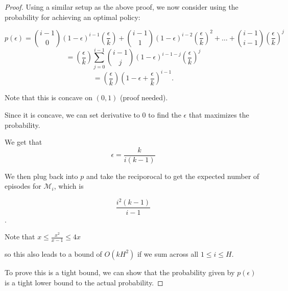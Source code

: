 \documentclass[12pt, letterpaper]{article}
\theoremstyle{definition}
\theoremstyle{remark}
\begin{document}
\begin{proof}[Proof]
    Using a similar setup as the above proof, we now consider using the probability for achieving an optimal policy:

    \[p(\epsilon) = {i-1 \choose 0} (1-\epsilon)^{i-1}(\frac{\epsilon}{k}) + {i-1 \choose 1}(1-\epsilon)^{i-2}(\frac{\epsilon}{k})^2 + \ldots + {i-1 \choose i-1} (\frac{\epsilon}{k})^j\]
    \[= (\frac{\epsilon}{k})\sum_{j=0}^{i-1}{i-1 \choose j} (1-\epsilon)^{i-1-j}(\frac{\epsilon}{k})^{j}\]
    \[= (\frac{\epsilon}{k})(1-\epsilon + \frac{\epsilon}{k})^{i-1}.\]

    Note that this is concave on \((0, 1)\) (proof needed).

    Since it is concave, we can set derivative to 0 to find the \(\epsilon\) that maximizes the probability.

    We get that
    \[\epsilon = \frac{k}{i(k-1)}\]

    We then plug back into \(p\) and take the reciporocal to get the expected number of episodes for \(\mathcal{M}_i\), which is

    \[\frac{i^2(k-1)}{i-1}\].

    Note that \(x \leq \frac{x^2}{x-1} \leq 4x\)

    so this also leads to a bound of \(O(kH^2)\) if we sum across all \(1 \leq i \leq H\).

    To prove this is a tight bound, we can show that the probability given by \(p(\epsilon)\) is a tight lower bound to the actual probability.
\end{proof}
\end{document}
